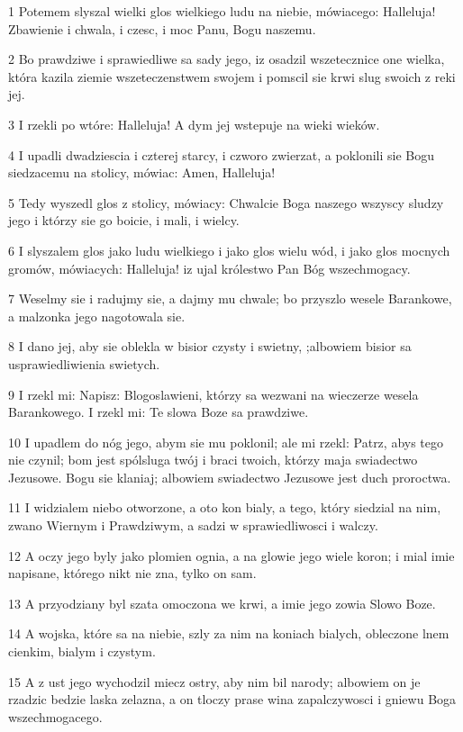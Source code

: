 \par 1 Potemem slyszal wielki glos wielkiego ludu na niebie, mówiacego: Halleluja! Zbawienie i chwala, i czesc, i moc Panu, Bogu naszemu.
\par 2 Bo prawdziwe i sprawiedliwe sa sady jego, iz osadzil wszetecznice one wielka, która kazila ziemie wszeteczenstwem swojem i pomscil sie krwi slug swoich z reki jej.
\par 3 I rzekli po wtóre: Halleluja! A dym jej wstepuje na wieki wieków.
\par 4 I upadli dwadziescia i czterej starcy, i czworo zwierzat, a poklonili sie Bogu siedzacemu na stolicy, mówiac: Amen, Halleluja!
\par 5 Tedy wyszedl glos z stolicy, mówiacy: Chwalcie Boga naszego wszyscy sludzy jego i którzy sie go boicie, i mali, i wielcy.
\par 6 I slyszalem glos jako ludu wielkiego i jako glos wielu wód, i jako glos mocnych gromów, mówiacych: Halleluja! iz ujal królestwo Pan Bóg wszechmogacy.
\par 7 Weselmy sie i radujmy sie, a dajmy mu chwale; bo przyszlo wesele Barankowe, a malzonka jego nagotowala sie.
\par 8 I dano jej, aby sie oblekla w bisior czysty i swietny, ;albowiem bisior sa usprawiedliwienia swietych.
\par 9 I rzekl mi: Napisz: Blogoslawieni, którzy sa wezwani na wieczerze wesela Barankowego. I rzekl mi: Te slowa Boze sa prawdziwe.
\par 10 I upadlem do nóg jego, abym sie mu poklonil; ale mi rzekl: Patrz, abys tego nie czynil; bom jest spólsluga twój i braci twoich, którzy maja swiadectwo Jezusowe. Bogu sie klaniaj; albowiem swiadectwo Jezusowe jest duch proroctwa.
\par 11 I widzialem niebo otworzone, a oto kon bialy, a tego, który siedzial na nim, zwano Wiernym i Prawdziwym, a sadzi w sprawiedliwosci i walczy.
\par 12 A oczy jego byly jako plomien ognia, a na glowie jego wiele koron; i mial imie napisane, którego nikt nie zna, tylko on sam.
\par 13 A przyodziany byl szata omoczona we krwi, a imie jego zowia Slowo Boze.
\par 14 A wojska, które sa na niebie, szly za nim na koniach bialych, obleczone lnem cienkim, bialym i czystym.
\par 15 A z ust jego wychodzil miecz ostry, aby nim bil narody; albowiem on je rzadzic bedzie laska zelazna, a on tloczy prase wina zapalczywosci i gniewu Boga wszechmogacego.
